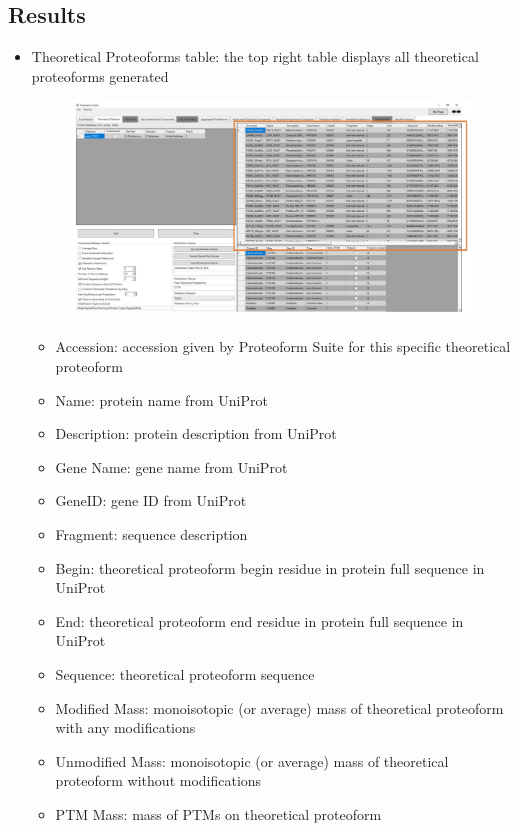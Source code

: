\subsection{Results}

\begin{itemize}
	\item Theoretical Proteoforms table: the top right table displays all theoretical proteoforms generated
	\begin{figure}[h]
\centering
\includegraphics[scale=0.42]{figures/theoretical2.jpg}
\end{figure}
	\begin{itemize}
		\item Accession: accession given by Proteoform Suite for this specific theoretical proteoform
		\item Name: protein name from UniProt
		\item Description: protein description from UniProt
		\item Gene Name: gene name from UniProt
		\item GeneID: gene ID from UniProt
		\item Fragment: sequence description
		\item Begin: theoretical proteoform begin residue in protein full sequence in UniProt
		\item End: theoretical proteoform end residue in protein full sequence in UniProt
		\item Sequence: theoretical proteoform sequence
		\item Modified Mass: monoisotopic (or average) mass of theoretical proteoform with any modifications
		\item Unmodified Mass: monoisotopic (or average) mass of theoretical proteoform without modifications
		\item PTM Mass: mass of PTMs on theoretical proteoform

\end{itemize}
\end{itemize}
